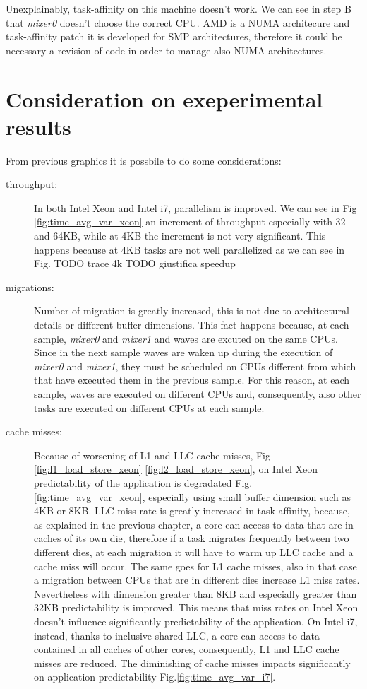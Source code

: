 Unexplainably, task-affinity on this machine doesn't work. We can see in step B that \textit{mixer0} doesn't choose the correct CPU. AMD is a NUMA 
architecure and task-affinity patch it is developed for SMP architectures, therefore it could be necessary a revision of code in order to manage also 
NUMA architectures.

\section{Consideration on exeperimental results}

From previous graphics it is possbile to do some considerations:

\begin{description}

\item[throughput:] In both Intel Xeon and Intel i7, parallelism is improved. We can see in Fig \ref{fig:time_avg_var_xeon} an increment of throughput 
especially with 32 and 64KB, while at 4KB the increment is not very significant. This happens because at 4KB tasks are not well parallelized as we can see 
in Fig. TODO trace 4k
TODO giustifica speedup

\item[migrations:] Number of migration is greatly increased, this is not due to architectural details or different buffer dimensions. This fact happens 
because, at each sample, \textit{mixer0} and \textit{mixer1} and waves are excuted on the same CPUs. Since in the next sample waves are waken up during the 
execution of \textit{mixer0} and \textit{mixer1}, they must be scheduled on CPUs different from which that have executed them in the previous sample. 
For this reason, at each sample, waves are executed on different CPUs and, consequently, also other tasks are executed on different CPUs at each sample.

\item[cache misses:] Because of worsening of L1 and LLC cache misses, Fig \ref{fig:l1_load_store_xeon} \ref{fig:l2_load_store_xeon}, on Intel Xeon 
predictability of the application is degradated Fig. \ref{fig:time_avg_var_xeon}, especially using small buffer dimension such as 4KB or 8KB. LLC miss rate 
is greatly increased in task-affinity, because, as explained in the previous chapter, a core can access to data that are in caches of its own die, 
therefore if a task migrates frequently between two different dies, at each migration it will have to warm up LLC cache and a cache miss will occur. The 
same goes for L1 cache misses, also in that case a migration between CPUs that are in different dies increase L1 miss rates. Nevertheless with dimension 
greater than 8KB and especially greater than 32KB predictability is improved. This means that miss rates on Intel Xeon doesn't influence significantly 
predictability of the application. On Intel i7, instead, thanks to inclusive shared LLC, a core can access to data contained in all caches of other cores, 
consequently, L1 and LLC cache misses are reduced. The diminishing of cache misses impacts significantly on application predictability 
Fig.\ref{fig:time_avg_var_i7}.


\end{description}
